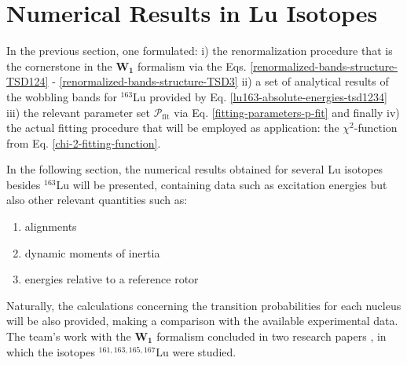 \section{Numerical Results in Lu Isotopes}

In the previous section, one formulated: i) the renormalization procedure that is the cornerstone in the $\mathbf{W_1}$ formalism via the Eqs. \ref{renormalized-bands-structure-TSD124} - \ref{renormalized-bands-structure-TSD3} ii) a set of analytical results of the wobbling bands for $^{163}$Lu provided by Eq. \ref{lu163-absolute-energies-tsd1234} iii) the relevant parameter set $\mathcal{P}_\text{fit}$ via Eq. \ref{fitting-parameters-p-fit} and finally iv) the actual fitting procedure that will be employed as application: the $\chi^2$-function from Eq. \ref{chi-2-fitting-function}.

In the following section, the numerical results obtained for several Lu isotopes besides $^{163}$Lu will be presented, containing data such as excitation energies but also other relevant quantities such as:
\begin{enumerate}
    \item alignments
    \item dynamic moments of inertia
    \item energies relative to a reference rotor
\end{enumerate}

Naturally, the calculations concerning the transition probabilities for each nucleus will be also provided, making a comparison with the available experimental data. The team's work with the $\mathbf{W_1}$ formalism concluded in two research papers \cite{raduta2020approach,raduta2020towards}, in which the isotopes $^{161,163,165,167}$Lu were studied.

